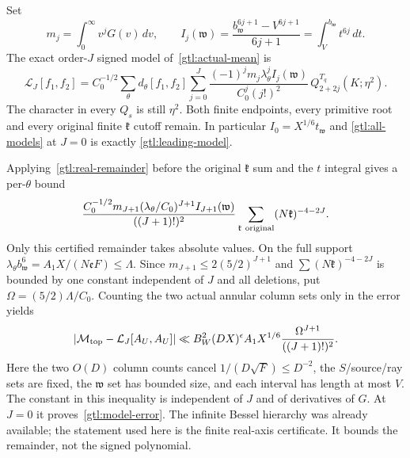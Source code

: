 Set
\begin{equation}\label{gtl:matched-moments}
 m_j=\int_0^\infty v^jG(v)\,dv,\qquad
 I_j(\mathfrak w)
   =\frac{b_{\mathfrak w}^{6j+1}-V^{6j+1}}{6j+1}
   =\int_V^{b_{\mathfrak w}}t^{6j}\,dt .
\end{equation}
The exact order-$J$ signed model of~\eqref{gtl:actual-mean} is
\begin{equation}\label{gtl:all-models}
 \mathcal L_J[f_1,f_2]
  =C_0^{-1/2}\sum_\theta d_\theta[f_1,f_2]
       \sum_{j=0}^J
        \frac{(-1)^jm_j\lambda_\theta^j I_j(\mathfrak w)}
             {C_0^j(j!)^2}\,
                   Q_{2+2j}^{T_q}(K;\eta^2).
\end{equation}
The character in every $Q_s$ is still $\eta^2$.
Both finite endpoints, every primitive root and every
original finite $\mathfrak k$ cutoff remain.
In particular $I_0=X^{1/6}t_{\mathfrak w}$ and
\eqref{gtl:all-models} at $J=0$ is exactly
\eqref{gtl:leading-model}.

Applying~\eqref{gtl:real-remainder} before the original
$\mathfrak k$ sum and the $t$ integral gives a per-$\theta$
bound
\begin{equation}\label{gtl:per-mode-error}
 \begin{split}
 \frac{C_0^{-1/2}m_{J+1}
        (\lambda_\theta/C_0)^{J+1}
        I_{J+1}(\mathfrak w)}
       {((J+1)!)^2}
     \sum_{\substack{\mathfrak k\ {\rm original}}}
                   (N\mathfrak k)^{-4-2J}.
 \end{split}
\end{equation}
Only this certified remainder takes absolute values.
On the full support
$\lambda_\theta b_{\mathfrak w}^6
 =A_1X/(N\mathfrak e F)\le\Lambda$.
Since $m_{J+1}\le2(5/2)^{J+1}$ and
$\sum(N\mathfrak k)^{-4-2J}$ is bounded by one constant
independent of $J$ and all deletions, put
$\Omega=(5/2)\Lambda/C_0$. Counting the two actual annular
column sets only in the error yields
\begin{equation}\label{gtl:all-model-error}
 |\mathcal M_{\rm top}-\mathcal L_J[A_U,A_U]|
 \ll B_W^2(DX)^\epsilon A_1X^{1/6}
             \frac{\Omega^{J+1}}{((J+1)!)^2}.
\end{equation}
Here the two $O(D)$ column counts cancel
$1/(D\sqrt F)\le D^{-2}$, the $S$/source/ray sets are fixed,
the $\mathfrak w$ set has bounded size, and each interval
has length at most $V$. The constant in this inequality is
independent of $J$ and of derivatives of $G$.
At $J=0$ it proves~\eqref{gtl:model-error}.
The infinite Bessel hierarchy was already available; the
statement used here is the finite real-axis certificate.
It bounds the remainder, not the signed polynomial.

